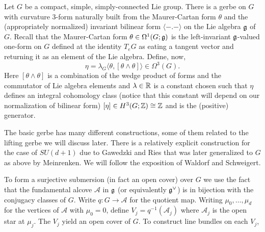 \documentclass{amsart}
\begin{document}
\begin{example}
    Let $G$ be a compact, simple, simply-connected Lie group. There is a gerbe on
    $G$ with curvature 3-form naturally built from the Maurer-Cartan form $\theta$
    and the (appropriately normalized) invariant bilinear form $\langle-.-\rangle$
    on the Lie algebra $\mathfrak g$ of $G$. Recall that the Maurer-Cartan form
    $\theta\in \Omega^1(G;\mathfrak g)$ is the left-invariant $\mathfrak g$-valued one-form on
    $G$ defined at the identity $T_eG$ as eating a tangent vector and returning it
    as an element of the Lie algebra. Define, now,
    \begin{equation*}
        \eta = \lambda_G \langle \theta, [\theta\wedge \theta] \rangle \in \Omega^3(G).
    \end{equation*}
    Here $[\theta\wedge\theta]$ is a combination of the wedge product of forms and
    the commutator of Lie algebra elements and $\lambda\in\mathbb{R}$ is a constant chosen such
    that $\eta$ defines an integral cohomology class (notice that this constant will
    depend on our normalization of bilinear form) $[\eta]\in H^3(G;\mathbb{Z})\cong\mathbb{Z}$
    and is the (positive) generator.

    The basic gerbe has many different constructions, some of them related to the lifting
    gerbe we will discuss later. There is a relatively explicit construction for the case
    of $SU(d+1)$ due to Gawedzki and Ries that was later generalized to $G$ as above by Meinrenken.
    We will follow the exposition of Waldorf and Schweigert.

    To form a surjective submersion (in fact an open cover) over $G$ we use the fact that
    the fundamental alcove $\mathcal{A}$ in $\mathfrak g$ (or equivalently $\mathfrak g^\vee$) is
    in bijection with the conjugacy classes of $G$. Write $q:G\to \mathcal{A}$ for the
    quotient map. Writing $\mu_0,\ldots, \mu_d$ for the vertices of $\mathcal{A}$ with
    $\mu_0=0$, define $V_j=q^{-1}(\mathcal{A}_j)$ where $\mathcal{A}_j$ is the open star
    at $\mu_j$. The $V_j$ yield an open cover of $G$. To construct line bundles on
    each $V_j$, 
\end{example}
\end{document}
